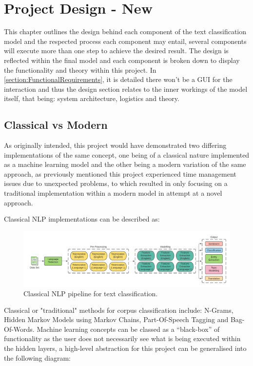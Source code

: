 \chapter{Project Design - New}

This chapter outlines the design behind each component of the text classification model and the respected process each component may entail, several components will execute more than one step to achieve the desired result. The design is reflected within the final model and each component is broken down to display the functionality and theory within this project. In \autoref{section:FunctionalRequirements}, it is detailed there won’t be a GUI for the interaction and thus the design section relates to the inner workings of the model itself, that being: system architecture, logistics and theory.

\section{Classical vs Modern}

As originally intended, this project would have demonstrated two differing implementations of the same concept, one being of a classical nature implemented as a machine learning model and the other being a modern variation of the same approach, as previously mentioned this project experienced time management issues due to unexpected problems, to which resulted in only focusing on a traditional implementation within a modern model in attempt at a novel approach.

Classical NLP implementations can be described as:

\begin{figure}[H]
    \centering
    \includegraphics[width=\textwidth]{figures/chapter-5/ClassicalNLP.pdf}
    \caption[ClassicalNLP]{Classical NLP pipeline for text classification.
    \label{fig:ClassicalNLP}}
\end{figure}

Classical or "traditional" methods for corpus classification include: N-Grams, Hidden Markov Models using Markov Chains, Part-Of-Speech Tagging and Bag-Of-Words. Machine learning concepts can be classed as a “black-box” of functionality as the user does not necessarily see what is being executed within the hidden layers, a high-level abstraction for this project can be generalised into the following diagram:

